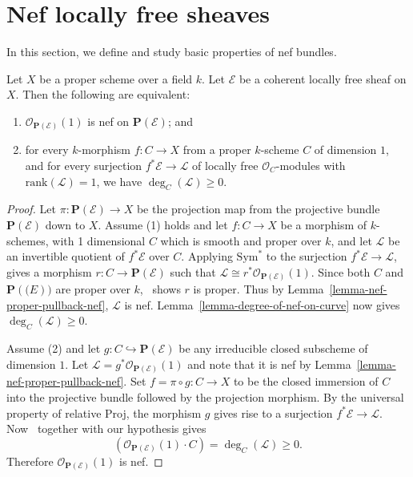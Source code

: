 \section{Nef locally free sheaves}
\label{section-nef-bundles}

In this section, we define and study basic properties of nef
bundles.

\begin{lemma}
\label{lemma-nef-bundle-equivalences}
Let $X$ be a proper scheme over a field $k$.
Let $\mathcal{E}$ be a coherent locally free sheaf on $X$.
Then the following are equivalent:
\begin{enumerate}
\item $\mathcal{O}_{\mathbf{P}(\mathcal{E})}(1)$ is nef on
  $\mathbf{P}(\mathcal{E})$; and
\item for every $k$-morphism $f : C \to X$ from a proper $k$-scheme $C$
of dimension $1$, and for every surjection $f^*\mathcal{E} \to \mathcal{L}$
of locally free $\mathcal{O}_C$-modules with $\mathrm{rank}(\mathcal{L}) = 1$,
we have $\deg_C(\mathcal{L}) \geq 0$.
\end{enumerate}
\end{lemma}

\begin{proof}
Let $\pi : \mathbf{P}(\mathcal{E}) \to X$ be the projection map from the
projective bundle $\mathbf{P}(\mathcal{E})$ down to $X$.
Assume (1) holds and let $f : C \to X$ be a morphism of $k$-schemes, with
1 dimensional $C$ which is smooth and proper over $k$, and let $\mathcal{L}$
be an invertible quotient of $f^*\mathcal{E}$ over $C$.
Applying $\mathrm{Sym}^*$ to the surjection $f^*\mathcal{E} \to \mathcal{L}$,
 gives a morphism $r : C \to \mathbf{P}(\mathcal{E})$ such that
$\mathcal{L} \cong r^*\mathcal{O}_{\mathbf{P}(\mathcal{E})}(1)$.
Since both $C$ and $\mathbf{P}(\mathcal(E))$ are proper over $k$,~
shows $r$ is proper.
Thus by Lemma~\ref{lemma-nef-proper-pullback-nef}, $\mathcal{L}$ is nef.
Lemma~\ref{lemma-degree-of-nef-on-curve} now gives $\deg_C(\mathcal{L}) \geq 0$.

Assume (2) and let $g : C \hookrightarrow \mathbf{P}(\mathcal{E})$ be
any irreducible closed subscheme of dimension $1$.
Let $\mathcal{L} = g^*\mathcal{O}_{\mathbf{P}(\mathcal{E})}(1)$ and note
that it is nef by Lemma~\ref{lemma-nef-proper-pullback-nef}.
Set $f = \pi \circ g: C \to X$ to be the closed immersion of $C$ into the
projective bundle followed by the projection morphism.
By the universal property of relative Proj, the morphism $g$ gives rise
to a surjection $f^*\mathcal{E} \to \mathcal{L}$.
Now~ together with our hypothesis gives
$$
(\mathcal{O}_{\mathbf{P}(\mathcal{E})}(1) \cdot C) = \deg_C(\mathcal{L}) \geq 0.
$$
Therefore $\mathcal{O}_{\mathbf{P}(\mathcal{E})}(1)$ is nef.
\end{proof}

